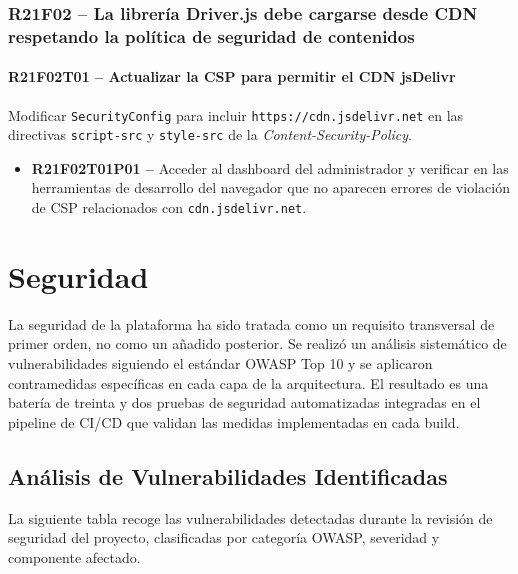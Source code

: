 \documentclass[12pt, a4paper]{report}
\begin{document}
\subsection{R21F02 -- La librería Driver.js debe cargarse desde CDN respetando la política de seguridad de contenidos}

\subsubsection{R21F02T01 -- Actualizar la CSP para permitir el CDN jsDelivr}
Modificar \texttt{SecurityConfig} para incluir \texttt{https://cdn.jsdelivr.net} en las directivas \texttt{script-src} y \texttt{style-src} de la \textit{Content-Security-Policy}.
\begin{itemize}
  \item \textbf{R21F02T01P01 --} Acceder al dashboard del administrador y verificar en las herramientas de desarrollo del navegador que no aparecen errores de violación de CSP relacionados con \texttt{cdn.jsdelivr.net}.
\end{itemize}

\chapter{Seguridad}

La seguridad de la plataforma ha sido tratada como un requisito transversal de primer orden, no como un añadido posterior. Se realizó un análisis sistemático de vulnerabilidades siguiendo el estándar OWASP Top 10 y se aplicaron contramedidas específicas en cada capa de la arquitectura. El resultado es una batería de treinta y dos pruebas de seguridad automatizadas integradas en el pipeline de CI/CD que validan las medidas implementadas en cada build.

\section{Análisis de Vulnerabilidades Identificadas}

La siguiente tabla recoge las vulnerabilidades detectadas durante la revisión de seguridad del proyecto, clasificadas por categoría OWASP, severidad y componente afectado.
\end{document}
